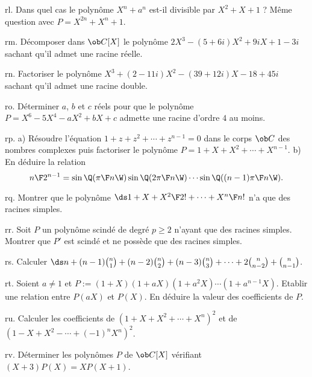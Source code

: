 \exo  [Level=1,Fight=0,Learn=0,Field=\Polynômes,Type=\Exercices,Origin=] rl. 
Dans quel cas le polynôme $X^n+a^n$ est-il divisible par $X^2+X+1$ ? Même question avec $P=X^{2n}+X^n+1$. 

\exo  [Level=1,Fight=1,Learn=1,Field=\Polynômes,Type=\Exercices,Origin=] rm. 
Décomposer dans $\ob C[X]$ le polynôme $2X^3-(5+6i)X^2+9iX+1-3i$ sachant qu'il admet une racine réelle. 

\exo  [Level=1,Fight=0,Learn=0,Field=\Polynômes,Type=\Exercices,Origin=] rn. 
Factoriser le polynôme $X^3+(2-11i)X^2-(39+12i)X-18+45i$ sachant qu'il admet une racine double. 

\exo  [Level=1,Fight=0,Learn=0,Field=\Polynômes,Type=\Exercices,Origin=] ro. 
Déterminer $a$, $b$ et $c$ réels pour que le polynôme $P=X^6-5X^4-aX^2+bX+c$ admette une racine d'ordre $4$ au moins. 

\exo  [Level=1,Fight=1,Learn=1,Field=\Polynômes,Type=\Exercices,Origin=] rp. 
a) Résoudre l'équation $1+z+z^2+\cdots+z^{n-1}=0$  dans le corps $\ob C$ des nombres complexes 
puis factoriser le polynôme $P=1+X+X^2+\cdots+X^{n-1}$. \pn
b) En déduire la relation
$$
{n\F2^{n-1}}=\sin\Q({\pi\F n}\W)\sin\Q({2\pi\F n}\W)\cdots\sin\Q({(n-1)\pi\F n}\W).
$$

\exo  [Level=1,Fight=1,Learn=1,Field=\Polynômes,Type=\Exercices,Origin=] rq. 
 Montrer que le polynôme $\ds1+X+{X^2\F 2!}+\cdots+{X^n\F n!}$ n'a que des racines simples. 

\exo  [Level=1,Fight=1,Learn=1,Field=\Polynômes,Type=\Exercices,Origin=] rr. 
Soit $P$ un polynôme scindé de degré $p\ge2$ n'ayant que des racines simples. Montrer que $P'$ est scindé et ne possède que des racines simples.  

\exo  [Level=1,Fight=1,Learn=1,Field=\Polynômes,Type=\Exercices,Origin=] rs. 
Calculer $\ds n+(n-1){n \choose1}+(n-2){n\choose 2}+(n-3){n\choose 3}+\cdots+2{n\choose n-2}+{n\choose n-1}$. 

\exo  [Level=1,Fight=2,Learn=2,Field=\Polynômes,Type=\Exercices,Origin=] rt. 
Soient $a\neq1$ et $P:=(1+X)(1+aX)(1+a^2X)\cdots(1+a^{n-1}X)$. Etablir une relation entre $P(aX)$ et $P(X)$. 
En déduire la valeur des coefficients de $P$. 

\exo  [Level=1,Fight=2,Learn=1,Field=\Polynômes,Type=\Exercices,Origin=] ru. 
Calculer les coefficients de $(1+X+X^2+\cdots+X^n)^2$ et de $(1-X+X^2-\cdots+(-1)^nX^n)^2$. 

\exo  [Level=1,Fight=2,Learn=2,Field=\Polynômes,Type=\Colles,Origin=] rv. 
Déterminer les polynômes $P$ de $\ob C[X]$ vérifiant $(X+3)P(X)=XP(X+1)$. 

